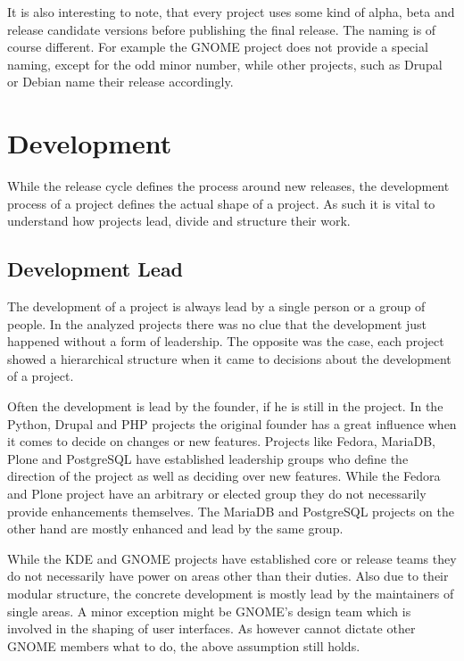 It is also interesting to note, that every project uses some kind of alpha,
beta and release candidate versions before publishing the final release. The
naming is of course different. For example the GNOME project does not provide a
special naming, except for the odd minor number, while other projects, such as
Drupal or Debian name their release accordingly.



\section{Development} %
\label{sec:Development}

While the release cycle defines the process around new releases, the
development process of a project defines the actual shape of a project. As such
it is vital to understand how projects lead, divide and structure their work.

\subsection{Development Lead} %
\label{sub:Development Lead}

The development of a project is always lead by a single person or a group of
people. In the analyzed projects there was no clue that the development just
happened without a form of leadership. The opposite was the case, each project
showed a hierarchical structure when it came to decisions about the development
of a project.

Often the development is lead by the founder, if he is still in the project.
In the Python, Drupal and PHP projects the original founder has a great
influence when it comes to decide on changes or new features. Projects like
Fedora, MariaDB, Plone and PostgreSQL have established leadership groups who
define the direction of the project as well as deciding over new features.
While the Fedora and Plone project have an arbitrary or elected group they do
not necessarily provide enhancements themselves. The MariaDB and PostgreSQL
projects on the other hand are mostly enhanced and lead by the same group.

While the KDE and GNOME projects have established core or release teams they do
not necessarily have power on areas other than their duties. Also due to their
modular structure, the concrete development is mostly lead by the maintainers
of single areas. A minor exception might be GNOME's design team which is
involved in the shaping of user interfaces. As however cannot dictate other
GNOME members what to do, the above assumption still holds.


